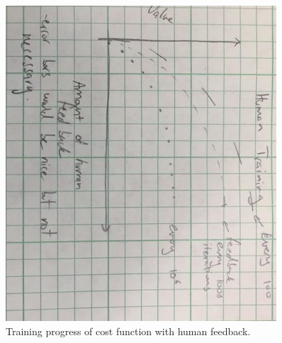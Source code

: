 \begin{figure}[h]
    \centering
    \includegraphics[width=0.9\textwidth]{Images/ToyHumanTrainingProgress.jpg}
    \caption{Training progress of cost function with human feedback.}
    \label{fig:ToyHumanTraningProgress}
\end{figure}

